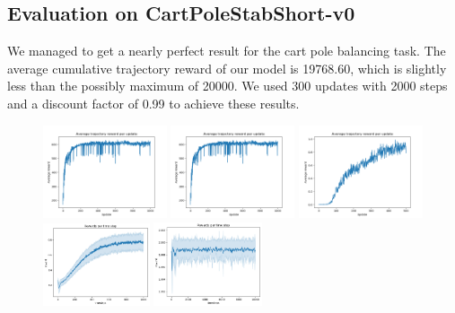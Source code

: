 \subsection{Evaluation on CartPoleStabShort-v0}

We managed to get a nearly perfect result for the cart pole balancing task. The average cumulative trajectory reward of our model is 19768.60, which is slightly less than the possibly maximum of 20000. We used 300 updates with 2000 steps and a discount factor of 0.99 to achieve these results.

\begin{figure}
	\begin{center}
		\includegraphics[width=0.325\textwidth]{plots/NAC_BB_training_mean_600.png}
		\includegraphics[width=0.325\textwidth]{plots/NAC_BB_training_mean_600.png}
		\includegraphics[width=0.325\textwidth]{plots/NAC_Qube_mean_traj_update_reward.png}
		\includegraphics[width=0.28\textwidth]{plots/NAC_BBtime_step_reward.png}	
		\hspace{4mm}
		\includegraphics[width=0.285\textwidth]{plots/NAC_CP_time_step_reward.png}

\end{center}
\end{figure}
